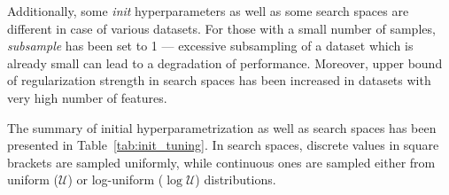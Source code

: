 \documentclass[magisterska, english]{pwr_wmat_praca_dyplomowa}
\theoremstyle{plain}
\numberwithin{theorem}{chapter}
\theoremstyle{definition}
\numberwithin{theorem}{chapter}
\begin{document}
Additionally, some \emph{init} hyperparameters as well as some search spaces are different in case of various datasets. For those with a small number of samples, \emph{subsample} has been set to 1 --- excessive subsampling of a dataset which is already small can lead to a degradation of performance. Moreover, upper bound of regularization strength in search spaces has been increased in datasets with very high number of features.

The summary of initial hyperparametrization as well as search spaces has been presented in Table~\ref{tab:init_tuning}. In search spaces, discrete values in square brackets are sampled uniformly, while continuous ones are sampled either from uniform ($\mathcal{U}$) or log-uniform ($\log\mathcal{U}$) distributions.

\begin{landscape}
\begin{table}[]
\centering
{}
\end{table}
\end{landscape}
\end{document}
